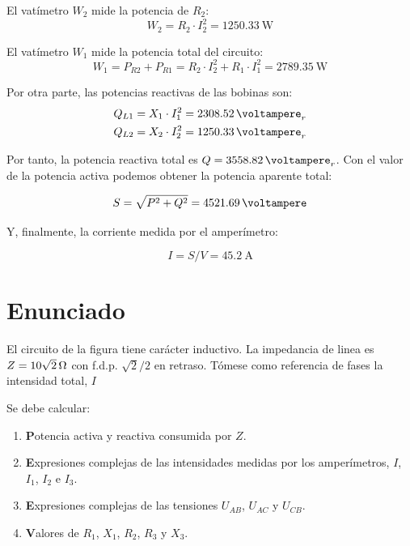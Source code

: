 El vatímetro $W_2$ mide la potencia de $R_2$:
\begin{equation*}
  W_2=R_2 \cdot I_2^2= \qty{1250.33}{\watt}
\end{equation*}

El vatímetro $W_1$ mide la potencia total del circuito:
\begin{equation*}
  W_1= P_{R2} + P_{R1} = R_2 \cdot I_2^2 + R_1 \cdot I_1^2 = \qty{2789.35}{\watt}
\end{equation*}

Por otra parte, las potencias reactivas de las bobinas son:
\begin{align*}
  Q_{L1} &= X_1 \cdot I_1^2 = \qty{2308.52}{\voltampere}_r\\
  Q_{L2} &= X_2 \cdot I_2^2 = \qty{1250.33}{\voltampere}_r
\end{align*}

Por tanto, la potencia reactiva total es $Q = \qty{3558.82}{\voltampere}_r$. Con el valor de la potencia activa podemos obtener la potencia aparente total:

\begin{equation*}
  S = \sqrt{P^2 + Q^2} = \qty{4521.69}{\voltampere}
\end{equation*}

Y, finalmente, la corriente medida por el amperímetro:

\begin{equation*}
  I = S/V = \qty{45.2}{\ampere}
\end{equation*}



\section{Enunciado}
El circuito de la figura tiene carácter inductivo.  La impedancia de
linea es $Z=\qty[parse-numbers=false]{10\sqrt{2}}{\ohm}$ con
f.d.p. $\sqrt{2}/2$ en retraso. Tómese como referencia de fases la
intensidad total, $I$

Se debe calcular:

\begin{enumerate}

\item \textbf Potencia activa y reactiva consumida por $Z$.

\item  \textbf Expresiones complejas de las intensidades medidas por los
  amperímetros, $I$, $I_1$, $I_2$ e $I_3$. 

\item  \textbf Expresiones complejas de las tensiones $U_{AB}$, $U_{AC}$ y
  $U_{CB}$.

\item  \textbf Valores de $R_1$, $X_1$, $R_2$, $R_3$ y $X_3$.

\end{enumerate}

